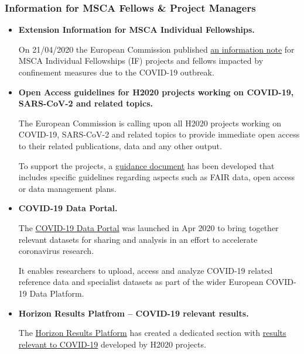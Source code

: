 \documentclass[oneside]{book}
\numberwithin{equation}{section}
\begin{document}
\subsubsection{Information for MSCA Fellows \& Project Managers}
\begin{itemize}
    \item \textbf{Extension Information for MSCA Individual Fellowships.}
    
    On 21/04/2020 the European Commission published \href{https://ec.europa.eu/research/mariecurieactions/news/coronavirus-extensions-msca-projects_en}{an information note} for MSCA Individual Fellowships (IF) projects and fellows impacted by confinement measures due to the COVID-19 outbreak.
    \item \textbf{Open Access guidelines for H2020 projects working on COVID-19, SARS-CoV-2 and related topics.}
    
    The European Commission is calling upon all H2020 projects working on COVID-19, SARS-CoV-2 and related topics to provide immediate open access to their related publications, data and any other output.
    
    To support the projects, a \href{https://ec.europa.eu/research/participants/docs/h2020-funding-guide/cross-cutting-issues/open-access-data-management/open-access_en.htm}{guidance document} has been developed that includes specific guidelines regarding aspects such as FAIR data, open access or data management plans.
    \item \textbf{COVID-19 Data Portal.}
    
    The \href{https://www.covid19dataportal.org/}{COVID-19 Data Portal} was launched in Apr 2020 to bring together relevant datasets for sharing and analysis in an effort to accelerate coronavirus research.
    
    It enables researchers to upload, access and analyze COVID-19 related reference data and specialist datasets as part of the wider European COVID-19 Data Platform.
    \item \textbf{Horizon Results Platfrom – COVID-19 relevant results.}
    
    The \href{https://ec.europa.eu/info/funding-tenders/opportunities/portal/screen/opportunities/horizon-results-platform}{Horizon Results Platform} has created a dedicated section with \href{https://ec.europa.eu/info/funding-tenders/opportunities/portal/screen/opportunities/horizon-results-platform/search;campaigns=1}{results relevant to COVID-19} developed by H2020 projects.
    

\end{itemize}
\end{document}
